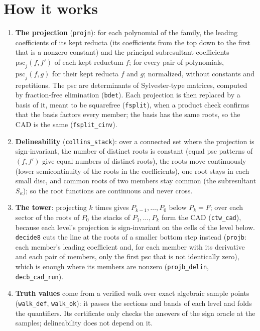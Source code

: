 \documentclass[11pt]{article}
\newcommand\code[1]{\mbox{\texttt{#1}}}
\begin{document}
\section{How it works}
\begin{enumerate}[leftmargin=1.3em, itemsep=3pt]
\item \textbf{The projection} (\code{projn}): for each polynomial of the family, the leading coefficients of its
kept reducta (its coefficients from the top down to the first that is a nonzero constant) and the principal
subresultant coefficients $\mathrm{psc}_j(f, f')$ of each kept reductum $f$; for every pair of polynomials,
$\mathrm{psc}_j(f, g)$ for their kept reducta $f$ and $g$; normalized, without constants and repetitions. The
psc are determinants of Sylvester-type matrices, computed by fraction-free elimination (\code{bdet}). Each
projection is then replaced by a basis of it, meant to be squarefree (\code{fsplit}), when a product check confirms
that the basis factors every member; the basis has the same roots, so the CAD is the same (\code{fsplit\_cinv}).
\item \textbf{Delineability} (\code{collins\_stack}): over a connected set where the projection is sign-invariant,
the number of distinct roots is constant (equal psc patterns of $(f, f')$ give equal numbers of distinct roots),
the roots move continuously (lower semicontinuity of the roots in the coefficients), one root stays in each small
disc, and common roots of two members stay common (the subresultant $S_\kappa$); so the root functions are
continuous and never cross.
\item \textbf{The tower}: projecting $k$ times gives $P_{k-1}, \dots, P_0$ below $P_k = F$; over each sector of
the roots of $P_0$ the stacks of $P_1, \dots, P_k$ form the CAD (\code{ctw\_cad}), because each level's
projection is sign-invariant on the cells of the level below. \texttt{decide8} cuts the line at the roots of a
smaller bottom step instead (\code{projb}: each member's leading coefficient and, for each member with its derivative and each pair of
members, only the first psc that is not identically zero), which is
enough where its members are nonzero (\code{projb\_delin}, \code{decb\_cad\_run}).
\item \textbf{Truth values} come from a verified walk over exact algebraic sample points (\code{walk\_def},
\code{walk\_ok}): it passes the sections and bands of each level and folds the quantifiers. Its certificate only
checks the answers of the sign oracle at the samples; delineability does not depend on it.
\end{enumerate}
\end{document}
